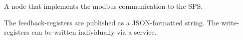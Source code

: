\documentclass[a4paper,12pt,twoside]{article}
\begin{document}
\label{\detokenize{meso_control_pkg:module-meso_control_pkg.modbus_tcp_node}}

\begin{fulllineitems}
\label{\detokenize{meso_control_pkg:meso_control_pkg.modbus_tcp_node.ModbusTcpNode}}
A node that implements the modbus communication to the SPS.

The feedback-registers are published as a JSON-formatted string.
The write-registers can be written individually via a service.

\end{fulllineitems}
\end{document}
